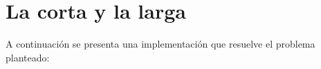 \section{La corta y la larga}

A continuación se presenta una implementación que resuelve el problema planteado:

